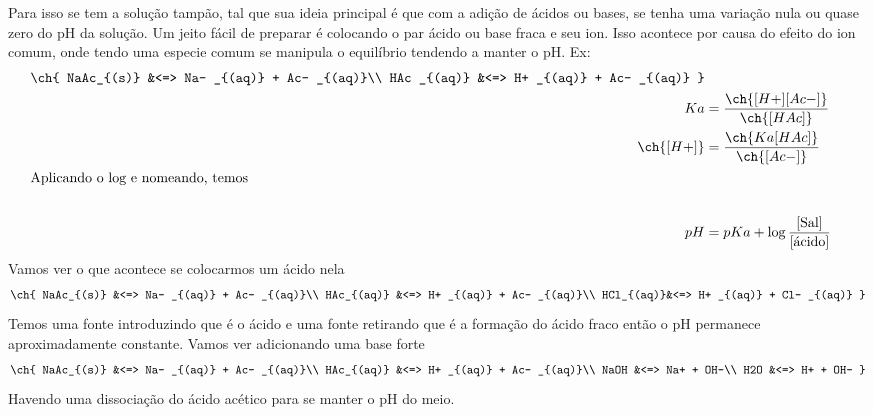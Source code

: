 Para isso se tem a solução tampão, tal que sua ideia principal é que com a adição de ácidos ou
bases, se tenha uma variação nula ou quase zero do pH da solução. Um jeito fácil de preparar é
colocando o par ácido ou base fraca e seu ion. Isso acontece por causa do efeito do ion comum, onde
tendo uma especie comum se manipula o equilíbrio tendendo a manter o pH. Ex:
\begin{align}
    \ch{
    NaAc_{(s)} &<=> Na- _{(aq)} + Ac- _{(aq)}\\
    HAc _{(aq)} &<=> H+ _{(aq)} + Ac- _{(aq)}
    }\\
    Ka&=\frac{\ch{[ H+ ][ Ac- ]}}{\ch{[HAc]}}\\
    \ch{[ H+ ]}&=\frac{\ch{Ka[HAc]}}{\ch{[ Ac- ]}}\\
    \intertext{Aplicando o log e nomeando, temos}\notag \\
    pH&=pKa + \log \frac{\text{[Sal]}}{\text{[ácido]}}
\end{align}
Vamos ver o que acontece se colocarmos um ácido nela
\begin{align}
    \ch{
    NaAc_{(s)} &<=> Na- _{(aq)} + Ac- _{(aq)}\\
    HAc_{(aq)} &<=> H+ _{(aq)} + Ac- _{(aq)}\\
    HCl_{(aq)}&<=> H+ _{(aq)} + Cl- _{(aq)}
    }\\
\end{align}
Temos uma fonte introduzindo  que é o ácido e uma fonte retirando que é a formação do ácido
fraco então o pH permanece aproximadamente constante. Vamos ver adicionando uma base forte
\begin{align}
    \ch{
    NaAc_{(s)} &<=> Na- _{(aq)} + Ac- _{(aq)}\\
    HAc_{(aq)} &<=> H+ _{(aq)} + Ac- _{(aq)}\\
    NaOH &<=> Na+ + OH-\\
    H2O &<=> H+ + OH-
    }
\end{align}
Havendo uma dissociação do ácido acético para se manter o pH do meio.
 